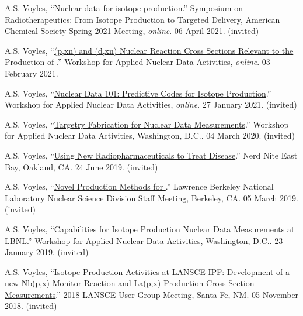 \begin{bibsection}
\item A.S. Voyles, \enquote{\href{https://www.morressier.com/o/event/6022c0c2e8bb0500118660c6/article/609136b66e987178c2dc86ae}{Nuclear data for isotope production}.} Symposium on Radiotherapeutics: From Isotope Production to Targeted
Delivery, American Chemical Society Spring 2021 Meeting, \emph{online}. 06 April 2021. (invited)

\item A.S. Voyles, \enquote{\href{https://conferences.lbl.gov/event/504/}{(p,xn) and (d,xn)  Nuclear Reaction Cross Sections Relevant to the Production of }.} Workshop for Applied Nuclear Data Activities, \emph{online}. 03 February 2021.

\item A.S. Voyles, \enquote{\href{https://conferences.lbl.gov/event/504/}{Nuclear Data 101: Predictive Codes for Isotope Production}.} Workshop for Applied Nuclear Data Activities, \emph{online}. 27 January 2021. (invited)

\item A.S. Voyles, \enquote{\href{https://conferences.lbl.gov/event/292/}{Targetry Fabrication for Nuclear Data Measurements}.} Workshop for Applied Nuclear Data Activities, Washington, D.C.. 04 March 2020. (invited)

\item A.S. Voyles, \enquote{\href{https://eastbay.nerdnite.com/nerd-nite-624-apollo-11-recovery-oakland-art-deco-radiopharmaceuticals/}{Using New Radiopharmaceuticals to Treat Disease}.} Nerd Nite East Bay, Oakland, CA. 24 June 2019. (invited)

\item A.S. Voyles, \enquote{\href{https://conferences.lbl.gov/event/188/}{Novel Production Methods for }.} Lawrence Berkeley National Laboratory Nuclear Science Division Staff Meeting, Berkeley, CA. 05 March 2019. (invited)

\item A.S. Voyles, \enquote{\href{https://conferences.lbl.gov/event/198/}{Capabilities for Isotope Production Nuclear Data Measurements at LBNL}.} Workshop for Applied Nuclear Data Activities, Washington, D.C.. 23 January 2019. (invited)

\item A.S. Voyles, \enquote{\href{https://lansce.lanl.gov/lug2018.php}{Isotope Production Activities at LANSCE-IPF: Development of a new Nb(p,x) Monitor Reaction and La(p,x) Production Cross-Section Measurements}.} 2018 LANSCE User Group Meeting, Santa Fe, NM. 05 November 2018. (invited)


\end{bibsection}
